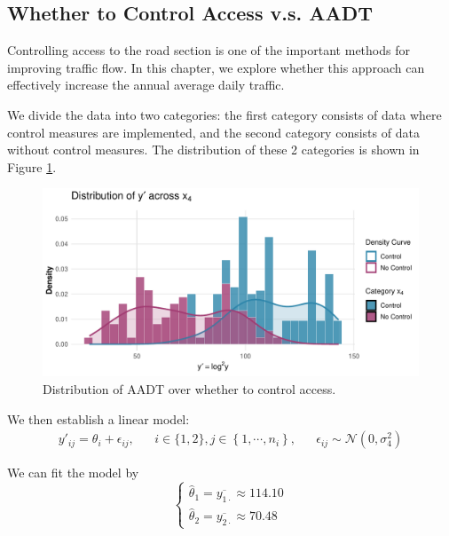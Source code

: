 \subsection{Whether to Control Access v.s. AADT}

Controlling access to the road section is one of the important methods for improving traffic flow. In this chapter, we explore whether this approach can effectively increase the annual average daily traffic.

We divide the data into two categories: the first category consists of data where control measures are implemented, and the second category consists of data without control measures. The distribution of these 2 categories is shown in Figure \ref{fig:x4_distribution}.

\begin{figure}
    \centering
    \includegraphics[width=1\linewidth]{figures/x4/histogram.pdf}
    \caption{Distribution of AADT over whether to control access.}
    \label{fig:x4_distribution}
\end{figure}

We then establish a linear model:
\begin{equation}
\begin{aligned}
y'_{ij} = \theta_i + \epsilon_{ij}, && i \in \{1, 2\}, j \in \left\{1, \cdots, n_i\right\}, && \epsilon_{ij}\sim \mathcal{N}\left(0, \sigma_4^2\right)
\end{aligned}
\end{equation}

We can fit the model by
\begin{equation}
    \begin{cases}
      \hat{\theta}_1 = \overline{y_{1\cdot}}\approx 114.10 \\
      \hat{\theta}_2 = \overline{y_{2\cdot}}\approx 70.48
    \end{cases}
\end{equation}


